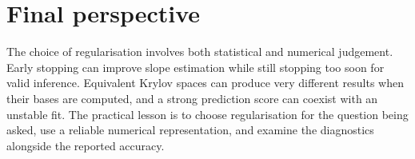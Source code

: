 \section{Final perspective}
\label{sec:conclusion-final-perspective}

The choice of regularisation involves both statistical and numerical
judgement.  Early stopping can improve slope
estimation while still stopping too soon for valid inference.  Equivalent
Krylov spaces can produce very different results when their bases are
computed, and a strong prediction score can coexist with an unstable fit.
The practical lesson is to choose regularisation for the question being
asked, use a reliable numerical representation, and examine the diagnostics
alongside the reported accuracy.
